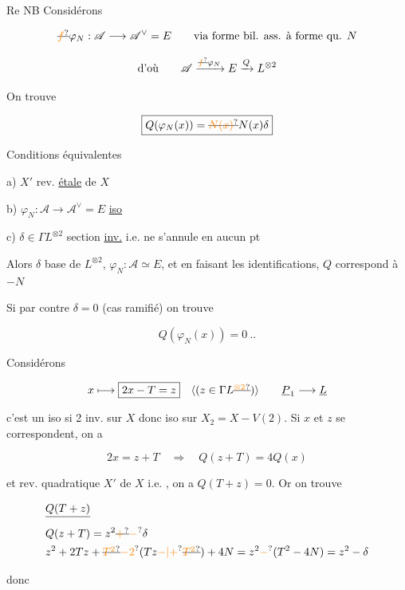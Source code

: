 Re NB \qquad Considérons

\[
\deleted{\unsure{f}}\varphi_N:\mathscr A\longrightarrow\mathscr A^\vee=E\qquad\text{via forme bil. ass. à forme qu. }N
\]

\[
\text{d'où}\qquad \mathscr A\xrightarrow{\deleted{\unsure{f}}\varphi_N}E\xrightarrow{Q}L^{\otimes 2}
\]

On trouve

\[
\boxed{Q(\varphi_N(x))=\deleted{\unsure{N(x)}}N(x)\delta}
\]



Conditions équivalentes

a) $X'$ rev. \uline{étale} de $X$

b) $\varphi_N:\mathscr A\longrightarrow\mathscr A^\vee=E$ \uline{iso}

c) $\delta\in\Gamma L^{\otimes 2}$ section \uline{inv.} i.e. ne s'annule en aucun pt

Alors $\delta$ base de $L^{\otimes 2}$, $\varphi_N:\mathscr A\simeq E$, et en faisant les identifications, $Q$ correspond à $-N$

Si par contre $\delta=0$ (cas  ramifié) on trouve

\[
Q(\varphi_N(x))=0\ ..
\]

Considérons

\[
x\longmapsto\boxed{2x-T=z}\quad\inserted{(z\in\Gamma L\deleted{\unsure{^{\otimes 2}}})}\qquad \underline P_1\longrightarrow\underline L
\]

c'est un iso si 2 inv. sur $X$ donc iso sur $X_2=X-V(2)$. Si $x$ et $z$ se correspondent, on a

\[
2x=z+T\quad\Longrightarrow\quad Q(z+T)=4Q(x)
\]

et   rev. quadratique $X'$ de $X$ i.e. , on a $Q(T+z)=0$. Or on trouve  

\[
\begin{aligned}
&\deleted{Q(T+z)}\\
&Q(z+T)=z^2\deleted{\unsure{+}} \unsure{-}\delta\\
&z^2+2Tz+\deleted{\unsure{T^2}}\unsure{-2}(Tz\unsure{-|+}\deleted{\unsure{T^2}})+4N=z^2\unsure{-}(T^2-4N)=z^2-\delta
\end{aligned}
\]

donc

